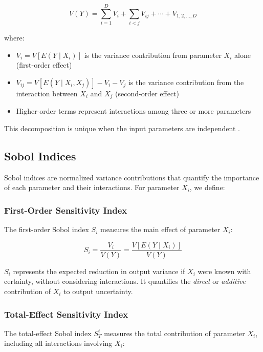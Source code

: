 \begin{equation}
V(Y) = \sum_{i=1}^{D} V_i + \sum_{i<j} V_{ij} + \cdots + V_{1,2,\ldots,D}
\end{equation}

where:
\begin{itemize}
    \item $V_i = V[E(Y \mid X_i)]$ is the variance contribution from parameter $X_i$ alone (first-order effect)
    \item $V_{ij} = V[E(Y \mid X_i, X_j)] - V_i - V_j$ is the variance contribution from the interaction between $X_i$ and $X_j$ (second-order effect)
    \item Higher-order terms represent interactions among three or more parameters
\end{itemize}

This decomposition is unique when the input parameters are independent \citep{saltelli2010variance}.

\subsection{Sobol Indices}

Sobol indices \citep{sobol1993sensitivity} are normalized variance contributions that quantify the importance of each parameter and their interactions. For parameter $X_i$, we define:

\subsubsection{First-Order Sensitivity Index}

The first-order Sobol index $S_i$ measures the main effect of parameter $X_i$:

\begin{equation}
S_i = \frac{V_i}{V(Y)} = \frac{V[E(Y \mid X_i)]}{V(Y)}
\label{eq:sobol_s1}
\end{equation}

$S_i$ represents the expected reduction in output variance if $X_i$ were known with certainty, without considering interactions. It quantifies the \emph{direct} or \emph{additive} contribution of $X_i$ to output uncertainty.

\subsubsection{Total-Effect Sensitivity Index}

The total-effect Sobol index $S_T^i$ measures the total contribution of parameter $X_i$, including all interactions involving $X_i$:

